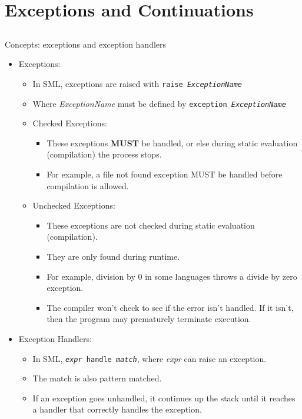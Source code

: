 \section{Exceptions and Continuations}\label{sec:Exceptions_Continuations}

\subsection{}
Concepts: exceptions and exception handlers

\begin{itemize}
\item Exceptions:
  \begin{itemize}[noitemsep]
  \item In SML, exceptions are raised with \texttt{raise \textit{ExceptionName}}
  \item Where \textit{ExceptionName} must be defined by \texttt{exception \textit{ExceptionName}}
  \item Checked Exceptions:
    \begin{itemize}[noitemsep]
    \item These exceptions \textbf{MUST} be handled, or else during static evaluation (compilation) the process stops.
    \item For example, a file not found exception MUST be handled before compilation is allowed.
    \end{itemize}

  \item Unchecked Exceptions:
    \begin{itemize}[noitemsep]
    \item These exceptions are not checked during static evaluation (compilation).
    \item They are only found during runtime.
    \item For example, division by 0 in some languages throws a divide by zero exception.
    \item The compiler won't check to see if the error isn't handled. If it isn't, then the program may prematurely terminate execution.
    \end{itemize}
  \end{itemize}

\item Exception Handlers:
  \begin{itemize}[noitemsep]
  \item In SML, \texttt{\textit{expr} handle \textit{match}}, where \textit{expr} can raise an exception.
  \item The match is also pattern matched.
  \item If an exception goes unhandled, it continues up the stack until it reaches a handler that correctly handles the exception.
  \end{itemize}
\end{itemize}


